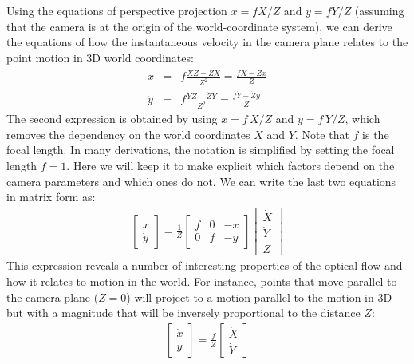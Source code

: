 Using the equations of perspective projection $x=f X/Z$ and $y=f Y/Z$ (assuming that the camera is at the origin of the world-coordinate system), we can derive the equations of how the instantaneous velocity in the camera plane relates to the point motion in 3D world coordinates:
\begin{eqnarray}
    \dot{x} & = & f \frac{\dot{X} Z - \dot{Z} X}{Z^2} = \frac{f \dot{X} - \dot{Z} x}{Z}\\
    \dot{y} & = & f \frac{\dot{Y} Z - \dot{Z} Y}{Z^2} = \frac{f \dot{Y} - \dot{Z} y}{Z}
\end{eqnarray}
The second expression is obtained by using $x=f \, X/Z$ and $y=f \, Y/Z$, which removes the dependency on the world coordinates $X$ and $Y$. Note that $f$ is the focal length. In many derivations, the notation is simplified by setting the focal length $f=1$. Here we will keep it to make explicit which factors depend on the camera parameters and which ones do not.
We can write the last two equations in matrix form as:
\begin{align}
    \begin{bmatrix}
        \dot{x} \\
        \dot{y}
    \end{bmatrix}
    = \frac{1}{Z}
    \begin{bmatrix}
        f & 0 & -x \\
        0 & f & -y
    \end{bmatrix}
    \begin{bmatrix}
        \dot{X} \\
        \dot{Y} \\
        \dot{Z}
    \end{bmatrix}
    \label{eq:motionprojection}
\end{align}
This expression reveals a number of interesting properties of the optical flow and how it relates to motion in the world. For instance, points that move parallel to the camera plane ($\dot{Z} = 0$) will project to a motion parallel to the motion in 3D but with a magnitude that will be inversely proportional to the distance $Z$:
\begin{align}
    \begin{bmatrix}
        \dot{x} \\
        \dot{y}
    \end{bmatrix}
    = \frac{f}{Z}
    \begin{bmatrix}
        \dot{X} \\
        \dot{Y}
    \end{bmatrix}
    \label{eq:parallelmotion}
\end{align}

